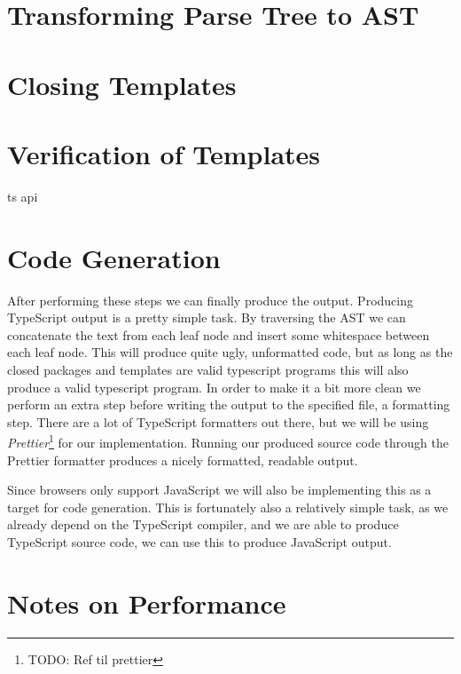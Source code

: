 \section{Transforming Parse Tree to AST}\label{sec:transforming-parse-tree-to-ast}


\section{Closing Templates}\label{sec:closing-templates}


\section{Verification of Templates}\label{sec:verification-of-templates}

ts api

\section{Code Generation}\label{sec:code-generation}

After performing these steps we can finally produce the output.
Producing TypeScript output is a pretty simple task.
By traversing the AST we can concatenate the text from each leaf node and insert some whitespace between each leaf node.
This will produce quite ugly, unformatted code, but as long as the closed packages and templates are valid typescript programs this will also produce a valid typescript program.
In order to make it a bit more clean we perform an extra step before writing the output to the specified file, a formatting step.
There are a lot of TypeScript formatters out there, but we will be using \textit{Prettier}\footnote{TODO: Ref til prettier} for our implementation.
Running our produced source code through the Prettier formatter produces a nicely formatted, readable output.

Since browsers only support JavaScript we will also be implementing this as a target for code generation.
This is fortunately also a relatively simple task, as we already depend on the TypeScript compiler, and we are able to produce TypeScript source code, we can use this to produce JavaScript output.

\section{Notes on Performance}\label{sec:notes-on-performance}


